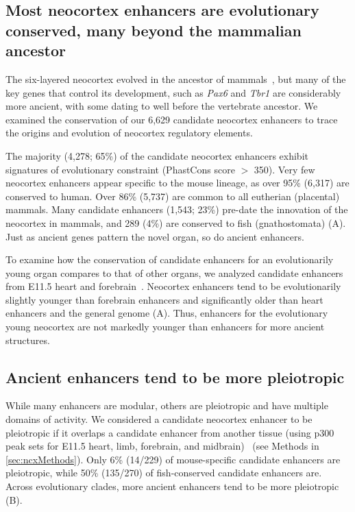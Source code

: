\subsection{Most neocortex enhancers are evolutionary conserved, many beyond the mammalian ancestor}
The six-layered neocortex evolved in the ancestor of mammals~\citep{Rakic2009}, but many of the key genes that control its development, such
as \textit{Pax6} and \textit{Tbr1} are considerably more ancient, with some dating to well before the vertebrate ancestor.  We examined the conservation of our
6,629 candidate neocortex enhancers to trace the origins and evolution of neocortex regulatory elements.

The majority (4,278; 65\%) of the candidate neocortex enhancers exhibit signatures of evolutionary constraint (PhastCons score $>$ 350).  Very few
neocortex enhancers appear specific to the mouse lineage, as over 95\% (6,317) are conserved to human.  Over 86\% (5,737) are common to all
eutherian (placental) mammals.  Many candidate enhancers (1,543; 23\%) pre-date the innovation of the neocortex in mammals, and 289 (4\%) are
conserved to fish (gnathostomata) (A).  Just as ancient genes pattern the novel organ, so do ancient enhancers.

To examine how the conservation of candidate enhancers for an evolutionarily young organ compares to that of other organs, we analyzed
candidate enhancers from E11.5 heart and forebrain~\citep{Blow2010}.  Neocortex enhancers tend to be evolutionarily slightly
younger than forebrain enhancers and significantly older than heart enhancers and the
general genome (A).  Thus, enhancers for the evolutionary young neocortex are not markedly younger than enhancers
for more ancient structures.

\subsection{Ancient enhancers tend to be more pleiotropic}
While many enhancers are modular, others are pleiotropic and have multiple domains of activity.  We considered a candidate neocortex
enhancer to be pleiotropic if it overlaps a candidate enhancer from another tissue (using p300 peak sets for E11.5 heart, limb,
forebrain, and midbrain)~\citep{Blow2010} (see Methods in \ref{sec:ncxMethods}).  Only 6\% (14/229) of mouse-specific candidate enhancers are pleiotropic, while 50\%
(135/270) of fish-conserved candidate enhancers are.  Across evolutionary clades, more ancient enhancers tend to be more pleiotropic (B).

